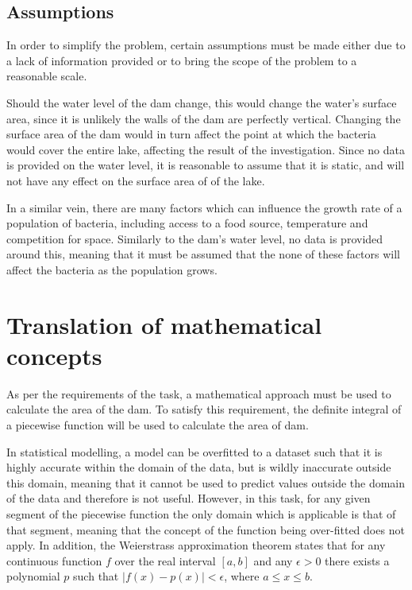 \documentclass{article}
\begin{document}
    
    \subsection{Assumptions}
    
    In order to simplify the problem, certain assumptions must be made either due to a lack of information provided or to bring the scope of the problem to a reasonable scale.

    Should the water level of the dam change, this would change the water's surface area, since it is unlikely the walls of the dam are perfectly vertical. Changing the surface area of the dam would in turn affect the point at which the bacteria would cover the entire lake, affecting the result of the investigation. Since no data is provided on the water level, it is reasonable to assume that it is static, and will not have any effect on the surface area of of the lake.

    In a similar vein, there are many factors which can influence the growth rate of a population of bacteria, including access to a food source, temperature and competition for space. Similarly to the dam's water level, no data is provided around this, meaning that it must be assumed that the none of these factors will affect the bacteria as the population grows.
    
\section{Translation of mathematical concepts}

    As per the requirements of the task, a mathematical approach must be used to calculate the area of the dam. To satisfy this requirement, the definite integral of a piecewise function will be used to calculate the area of dam.

    In statistical modelling, a model can be overfitted to a dataset such that it is highly accurate within the domain of the data, but is wildly inaccurate outside this domain, meaning that it cannot be used to predict values outside the domain of the data and therefore is not useful. However, in this task, for any given segment of the piecewise function the only domain which is applicable is that of that segment, meaning that the concept of the function being over-fitted does not apply. In addition, the Weierstrass approximation theorem states that for any continuous function $f$ over the real interval $[a, b]$ and any $\epsilon > 0$ there exists a polynomial $p$ such that $|f(x) - p(x)| < \epsilon$, where $a \leq x \leq b$.
 
\end{document}
